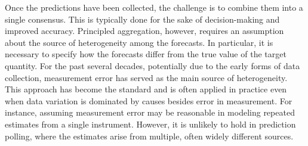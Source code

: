 \documentclass[11pt]{article}
\theoremstyle{definition}
\theoremstyle{definition}
\begin{document}



Once the predictions have been collected, the challenge is to combine them into a single consensus. This is typically done for the sake of decision-making and improved accuracy. Principled aggregation, however, requires an assumption about the source of heterogeneity among the forecasts. In particular, it is necessary to specify how the forecasts differ from the true value of the target quantity. For the past several decades, potentially due to the early forms of data collection, measurement error has served as the main source of heterogeneity. This approach has become the standard and is often applied in practice even when data variation is dominated  by causes besides error in measurement. For instance, assuming measurement error may be reasonable in modeling repeated estimates from a single instrument. However, it is unlikely to hold in prediction polling, where the estimates arise from multiple, often widely different sources. 

\end{document}
